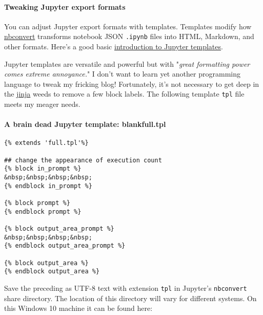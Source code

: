 \hypertarget{tweaking-jupyter-export-formats}{%
\paragraph{\texorpdfstring{Tweaking Jupyter export
formats\protect\hyperlink{Tweaking-Jupyter-export-formats}{}}{Tweaking Jupyter export formats}}\label{tweaking-jupyter-export-formats}}

You can adjust Jupyter export formats with templates. Templates modify
how \href{https://nbconvert.readthedocs.io/en/latest/}{nbconvert}
transforms notebook JSON \texttt{.ipynb} files into HTML, Markdown, and
other formats. Here's a good basic
\href{https://nbconvert.readthedocs.io/en/latest/customizing.html}{introduction
to Jupyter templates}.

Jupyter templates are versatile and powerful but with "\emph{great
formatting power comes extreme annoyance.}" I don't want to learn yet
another programming language to tweak my fricking blog! Fortunately,
it's not necessary to get deep in the
\href{https://jinja.palletsprojects.com/en/2.11.x/}{jinja} weeds to
remove a few block labels. The following template \texttt{tpl} file
meets my meager needs.

\hypertarget{a-brain-dead-jupyter-template-blankfull.tpl}{%
\paragraph{\texorpdfstring{A brain dead Jupyter template:
blankfull.tpl\href{-blankfull.tpl}{}}{A brain dead Jupyter template: blankfull.tpl}}\label{a-brain-dead-jupyter-template-blankfull.tpl}}

\begin{verbatim}
{% extends 'full.tpl'%}

## change the appearance of execution count
{% block in_prompt %}
&nbsp;&nbsp;&nbsp;&nbsp;
{% endblock in_prompt %}

{% block prompt %}
{% endblock prompt %}

{% block output_area_prompt %}
&nbsp;&nbsp;&nbsp;&nbsp;
{% endblock output_area_prompt %}

{% block output_area %}
{% endblock output_area %}
\end{verbatim}

Save the preceding as UTF-8 text with extension \texttt{tpl} in
Jupyter's \texttt{nbconvert} share directory. The location of this
directory will vary for different systems. On this Windows 10 machine it
can be found here:

